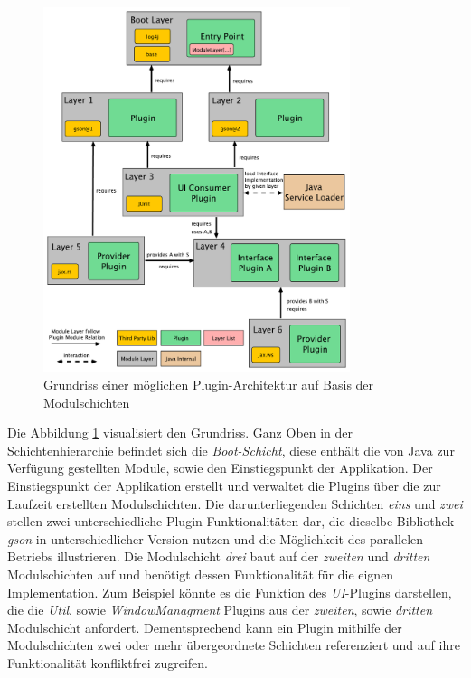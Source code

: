 	\begin{figure}[t]
		   \centering
		   \captionsetup{justification=centering}
		   \includegraphics[width=0.8\textwidth]{material/images/ModulLayerDepsDraw.pdf}
		   \caption{Grundriss einer möglichen Plugin-Architektur auf Basis der Modulschichten}
		   \label{fig:ModSchichtKonzept}
	\end{figure}
\newpage	
	Die Abbildung \ref{fig:ModSchichtKonzept} visualisiert den Grundriss. Ganz Oben in der Schichtenhierarchie befindet sich die \textit{Boot-Schicht}, diese enthält die von Java zur Verfügung gestellten Module, sowie den Einstiegspunkt der Applikation. Der Einstiegspunkt der Applikation erstellt und verwaltet die Plugins über die zur Laufzeit erstellten Modulschichten. Die darunterliegenden Schichten \textit{eins} und \textit{zwei} stellen zwei unterschiedliche Plugin Funktionalitäten dar, die dieselbe Bibliothek \textit{gson} in unterschiedlicher Version nutzen und die Möglichkeit des parallelen Betriebs illustrieren. Die Modulschicht \textit{drei} baut auf der \textit{zweiten} und \textit{dritten} Modulschichten auf und benötigt dessen Funktionalität für die eignen Implementation. Zum Beispiel könnte es die Funktion des \textit{UI}-Plugins darstellen, die die \textit{Util}, sowie \textit{WindowManagment} Plugins aus der \textit{zweiten}, sowie \textit{dritten} Modulschicht anfordert. Dementsprechend kann ein Plugin mithilfe der Modulschichten zwei oder mehr übergeordnete Schichten referenziert und auf ihre Funktionalität konfliktfrei zugreifen.\newline
